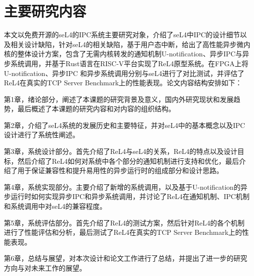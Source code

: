 \section{主要研究内容}
本文以免费开源的seL4的IPC系统主要研究对象，介绍了seL4中IPC的设计细节以及相关设计缺陷，针对seL4的相关缺陷，基于用户态中断，给出了高性能异步微内核的整体设计方案，包含了无需内核转发的通知机制U-notification、异步IPC与异步系统调用，并基于Rust语言在RISC-V平台实现了ReL4原型系统。在FPGA上将U-notification、异步IPC 和异步系统调用分别与seL4进行了对比测试，并评估了ReL4在真实的TCP Server Benchmark上的性能表现。论文内容结构安排如下：

第1章，绪论部分，阐述了本课题的研究背景及意义，国内外研究现状和发展趋势，最后概述了本课题的研究内容和对内容的组织结构。

第2章，介绍了seL4系统的发展历史和主要特征，并对seL4中的基本概念以及IPC设计进行了系统性阐述。

第3章，系统设计部分。首先介绍了ReL4与seL4的关系，ReL4的特点以及设计目标，然后介绍了ReL4如何对系统中各个部分的通知机制进行支持和优化，最后介绍了用于保证兼容性和提升易用性的异步运行时的组成部分和设计思路。

第4章，系统实现部分。主要介绍了新增的系统调用，以及基于U-notification的异步运行时如何实现异步IPC和异步系统调用，并讨论了ReL4在通知机制、IPC机制和系统调用中对seL4的兼容程度。

第5章，系统评估部分。首先介绍了ReL4的测试方案，然后针对ReL4的各个机制进行了性能评估和分析，最后测试了ReL4在真实的TCP Server Benchmark上的性能表现。

第6章，总结与展望，对本次设计和论文工作进行了总结，并提出了进一步的研究方向与对未来工作的展望。